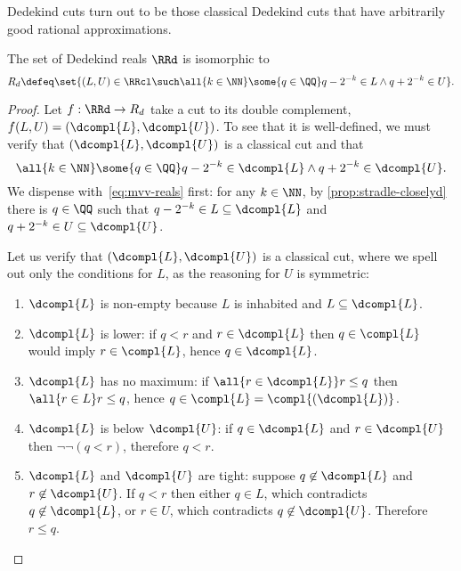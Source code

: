 Dedekind cuts turn out to be those classical Dedekind cuts that have arbitrarily good rational approximations.

\begin{theoremC}
  \label{thm:reals-sub-classical}
  The set of Dedekind reals $\RRd$ is isomorphic to
  \begin{equation}
    \label{eq:reals-sub-classical}%
    R_d \defeq \set{ (L, U) \in \RRcl \such 
       \all{k \in \NN} \some{q \in \QQ} q - 2^{-k} \in L \land q + 2^{-k} \in U
     }.
   \end{equation}
\end{theoremC}

\begin{proof}
  Let $f : \RRd \to R_d$ take a cut to its double complement, $f(L, U) = (\dcompl{L}, \dcompl{U})$.
  To see that it is well-defined, we must verify that $(\dcompl{L}, \dcompl{U})$ is a classical cut and that
  \begin{equation}
    \label{eq:mvv-reals}
    \all{k \in \NN} \some{q \in \QQ} q - 2^{-k} \in \dcompl{L} \land q + 2^{-k} \in \dcompl{U}.
  \end{equation}
  We dispense with~\eqref{eq:mvv-reals} first: for any $k \in \NN$, by \cref{prop:stradle-closelyd} there is $q \in \QQ$ such that $q - 2^{-k} \in L \subseteq \dcompl{L}$ and $q + 2^{-k} \in U \subseteq \dcompl{U}$.

  Let us verify that $(\dcompl{L}, \dcompl{U})$ is a classical cut, where we spell out only the conditions for $L$, as the reasoning for $U$ is symmetric:
  \begin{enumerate}
  \item $\dcompl{L}$ is non-empty because $L$ is inhabited and $L \subseteq \dcompl{L}$.
  \item $\dcompl{L}$ is lower: if $q < r$ and $r \in \dcompl{L}$ then $q \in \compl{L}$ would imply $r \in \compl{L}$, hence $q \in \dcompl{L}$.
  \item $\dcompl{L}$ has no maximum: if  $\all{r \in \dcompl{L}} r \leq q$ then $\all{r \in L} r \leq q$, hence $q \in \compl{L} = \compl{(\dcompl{L})}$.
  \item $\dcompl{L}$ is below $\dcompl{U}$: if $q \in \dcompl{L}$ and $r \in \dcompl{U}$ then $\lnot\lnot(q < r)$, therefore $q < r$.
  \item $\dcompl{L}$ and $\dcompl{U}$ are tight: suppose $q \not\in \dcompl{L}$ and $r \not\in \dcompl{U}$. If $q < r$ then either $q \in L$, which contradicts $q \not\in \dcompl{L}$, or $r \in U$, which contradicts $q \not\in \dcompl{U}$. Therefore $r \leq q$.
  \end{enumerate}


\end{proof}
